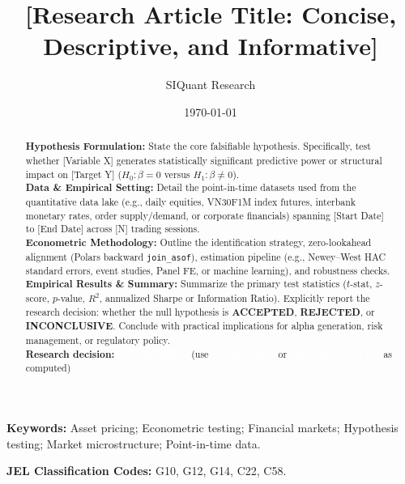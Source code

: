 \documentclass{article}
\title{\textbf{[Research Article Title: Concise, Descriptive, and Informative]}}
\author[1]{SIQuant Research}
\affil[1]{Hypothesis $\times$ Quant}
\date{\today}
\begin{document}
\maketitle

\begin{abstract}
\noindent \textbf{Hypothesis Formulation:} State the core falsifiable hypothesis. Specifically, test whether [Variable X] generates statistically significant predictive power or structural impact on [Target Y] ($H_0: \beta = 0$ versus $H_1: \beta \ne 0$). \\
\textbf{Data \& Empirical Setting:} Detail the point-in-time datasets used from the quantitative data lake (e.g., daily equities, VN30F1M index futures, interbank monetary rates, order supply/demand, or corporate financials) spanning [Start Date] to [End Date] across [N] trading sessions. \\
\textbf{Econometric Methodology:} Outline the identification strategy, zero-lookahead alignment (Polars backward \texttt{join\_asof}), estimation pipeline (e.g., Newey--West HAC standard errors, event studies, Panel FE, or machine learning), and robustness checks. \\
\textbf{Empirical Results \& Summary:} Summarize the primary test statistics ($t$-stat, $z$-score, $p$-value, $R^2$, annualized Sharpe or Information Ratio). Explicitly report the research decision: whether the null hypothesis is \textbf{ACCEPTED}, \textbf{REJECTED}, or \textbf{INCONCLUSIVE}. Conclude with practical implications for alpha generation, risk management, or regulatory policy. \\
\textbf{Research decision:} \colorbox[rgb]{0.10,0.50,0.20}{\textcolor{white}{\textbf{\,ACCEPTED\,}}} \ (use \colorbox[rgb]{0.75,0.15,0.15}{\textcolor{white}{\textbf{\,REJECTED\,}}} or \colorbox[rgb]{0.80,0.50,0.05}{\textcolor{white}{\textbf{\,INCONCLUSIVE\,}}} as computed)
\end{abstract}

\vspace{0.5em}
\noindent \textbf{Keywords:} Asset pricing; Econometric testing; Financial markets; Hypothesis testing; Market microstructure; Point-in-time data.

\vspace{0.5em}
\noindent \textbf{JEL Classification Codes:} G10, G12, G14, C22, C58.

\newpage

\end{document}
